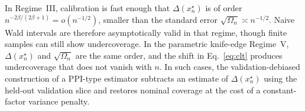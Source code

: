 In Regime~III, calibration is fast enough that $\Delta(x_n^\star)$ is of order $n^{-2\beta/(2\beta+1)}=o(n^{-1/2})$, smaller than the standard error $\sqrt{\Omega_n}\asymp n^{-1/2}$. Naive Wald intervals are therefore asymptotically valid in that regime, though finite samples can still show undercoverage. In the parametric knife-edge Regime~V, $\Delta(x_n^\star)$ and $\sqrt{\Omega_n}$ are the same order, and the shift in Eq.~\ref{eq:clt} produces undercoverage that does not vanish with $n$. In such cases, the validation-debiased construction of a PPI-type estimator subtracts an estimate of $\Delta(x_n^\star)$ using the held-out validation slice and restores nominal coverage at the cost of a constant-factor variance penalty.

